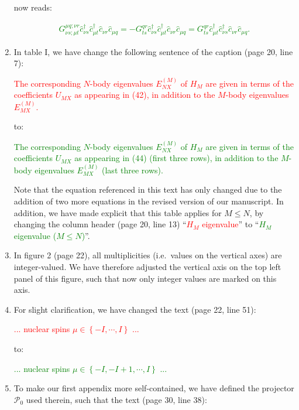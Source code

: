 \documentclass[preprint,showkeys,nofootinbib]{revtex4-1}
\renewcommand{\set}[1]{\left\{#1\right\}} %
\renewcommand{\c}{\hat{c}}
\renewcommand{\P}{\mathcal{P}}
\newcommand{\1}{\mathds{1}}
\newcommand{\red}[1]{\textcolor{red}{#1}}
\newcommand{\green}[1]{\textcolor{green}{#1}}
\begin{document}
\begin{enumerate}[label=(R3.\arabic*)]
  now reads:

  \green{\begin{align*}
      G^{\mu q;\nu r}_{\nu s;\mu t}
      \c_{\nu s}^\dag \c_{\mu t}^\dag \c_{\nu r} \c_{\mu q}
      = -G^{qr}_{ts} \c_{\nu s}^\dag \c_{\mu t}^\dag \c_{\nu r} \c_{\mu q}
      = G^{qr}_{ts} \c_{\mu t}^\dag \c_{\nu s}^\dag \c_{\nu r} \c_{\mu q}.
      \tag{21}
    \end{align*}}


\item In table I, we have change the following sentence of the caption
  (page 20, line 7):

  \red{The corresponding $N$-body eigenvalues $E_{NX}^{(M)}$ of $H_M$
    are given in terms of the coefficients $U_{MX}$ as appearing in
    (42), in addition to the $M$-body eigenvalues $E_{MX}^{(M)}$.}

  to:

  \green{The corresponding $N$-body eigenvalues $E_{NX}^{(M)}$ of
    $H_M$ are given in terms of the coefficients $U_{MX}$ as appearing
    in (44) (first three rows), in addition to the $M$-body
    eigenvalues $E_{MX}^{(M)}$ (last three rows).}

  Note that the equation referenced in this text has only changed due
  to the addition of two more equations in the revised version of our
  manuscript.  In addition, we have made explicit that this table
  applies for $M\le N$, by changing the column header (page 20, line
  13) ``\red{$H_M$ eigenvalue}'' to ``\green{$H_M$ eigenvalue
    ($M\le N$)}''.


\item In figure 2 (page 22), all multiplicities (i.e.~values on the
  vertical axes) are integer-valued.  We have therefore adjusted the
  vertical axis on the top left panel of this figure, such that now
  only integer values are marked on this axis.


\item For slight clarification, we have changed the text (page 22,
  line 51):

  \red{... nuclear spins $\mu\in\set{-I,\cdots,I}$ ...}

  to:

  \green{... nuclear spins $\mu\in\set{-I,-I+1,\cdots,I}$ ...}


\item To make our first appendix more self-contained, we have defined
  the projector $\P_0$ used therein, such that the text (page 30, line
  38):


\end{enumerate}
\end{document}
